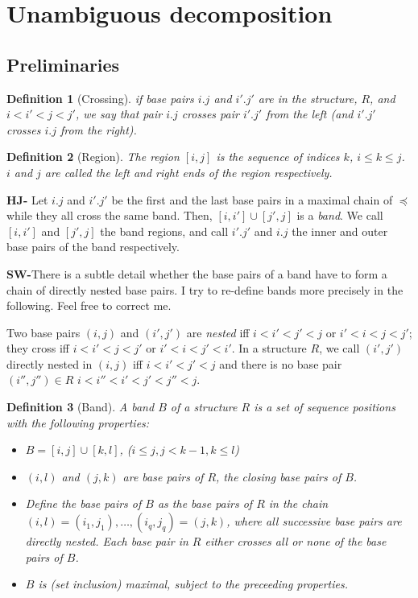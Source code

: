 \documentclass[11pt]{article} %
\newtheorem{definition}{Definition}
\newcommand{\SW}[1]{\textbf{SW-}#1}
\begin{document}
\section{Unambiguous decomposition}

\subsection{Preliminaries}

\begin{definition}[Crossing]
if base pairs $i.j$ and $i'.j'$ are in the structure, $R$, and $i<i'<j<j'$, we say that pair $i.j$ crosses pair $i'.j'$ from the left (and $i'.j'$ crosses $i.j$ from the right).
\end{definition}

\begin{definition}[Region] 
The \emph{region $[i,j]$} is the sequence of indices $k$, $i\leq k\leq j$.
$i$ and $j$ are called the left and right ends of the region respectively. 
\end{definition}

\textbf{HJ-}  Let $i.j$ and $i'.j'$ be the first and the last base pairs in a maximal 
chain of $\preceq$ while they all cross the same band. Then, $[i,i'] \cup [j',j]$ is a \emph{band}. 
We call $[i,i']$ and $[j',j]$ the band regions, 
and call $i'.j'$ and $i.j$ the inner and outer base pairs of the band respectively.

\SW{There is a subtle detail whether the base pairs of a band have to form a chain of directly nested base pairs. I try to re-define bands more precisely in the following. Feel free to correct me.}

Two base pairs $(i,j)$ and $(i',j')$ are \emph{nested} iff $i<i'<j'<j$ or $i'<i<j<j'$; they cross iff $i<i'<j<j'$ or $i'<i<j'<i'$. In a structure $R$, we call $(i',j')$ directly nested in $(i,j)$ iff $i<i'<j'<j$ and there is no base pair $(i'',j'')\in R$  $i<i''<i'<j'<j''<j$.

\begin{definition}[Band]
A \emph{band} $B$ of a structure $R$ is a set of sequence positions with the following properties:
\begin{itemize}
\item $B=[i,j]\cup[k,l]$, ($i\leq j, j<k-1, k\leq l$)
\item $(i,l)$ and $(j,k)$ are base pairs of $R$, the \emph{closing base pairs of $B$}.
\item Define the \emph{base pairs of $B$} as the base pairs of $R$
in the chain $(i,l)=(i_1,j_1), \dots, (i_q,j_q)=(j,k)$, where all successive base pairs are directly nested.
 Each base pair in $R$ either crosses all or none of the base pairs of $B$. 
\item $B$ is (set inclusion) maximal, subject to the preceeding properties.
\end{itemize}
\end{definition}
\end{document}
